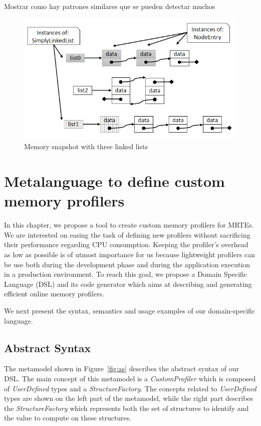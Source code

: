 Mostrar como hay patrones similares que se pueden detectar muchos

\begin{figure}[!ht]
\centering
\includegraphics[width=0.65\linewidth]{chapter6/fig/lists}
\caption{Memory snapshot with three linked lists}
\label{fig:simple_snapshot}
\end{figure}


\section{Metalanguage to define custom memory profilers}\label{sec:approach}

In this chapter, we propose a tool to create custom memory profilers for MRTEs.
We are interested on easing the task of defining new profilers without sacrificing their performance regarding CPU consumption.
Keeping the profiler's overhead as low as possible is of utmost importance for us because lightweight profilers can be use both during the development phase and during the application execution in a production environment.
To reach this goal, we propose a Domain Specific Language (DSL) and its code generator which aims at describing and generating efficient online memory profilers. 

We next present the syntax, semantics and usage examples of our domain-specific language.

\subsection{Abstract Syntax}\label{sec:abstract-syntax}

The metamodel shown in Figure~\ref{fig:as} describes the abstract syntax of our DSL.
The main concept of this metamodel is a \textit{CustomProfiler} which is composed of \textit{UserDefined} types and a \textit{StructureFactory}.
The concepts related to \textit{UserDefined} types are shown on the left part of the metamodel, while the right part describes the \textit{StructureFactory} which represents both the set of  structures to identify and the value to compute on these structures.

